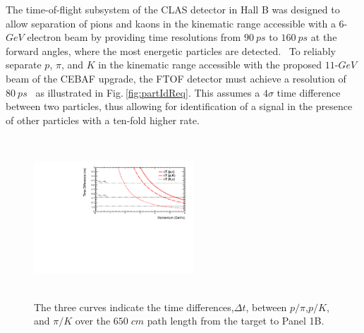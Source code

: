 The time-of-flight subsystem of the CLAS detector in Hall B was designed to allow separation of pions and kaons in the kinematic range accessible with a $6$-$GeV$ electron beam by providing time resolutions from $90\:ps$ to $160\:ps$ at the forward angles, where the most energetic particles are detected.~\cite{clastof} To reliably separate $p$, $\pi$, and $K$ in the kinematic range accessible with the proposed $11$-$GeV$ beam of the CEBAF upgrade, the FTOF detector must achieve a resolution of $80\:ps$~\cite{tdr} as illustrated in Fig.$\:$\ref{fig:partIdReq}. This assumes a $4\sigma$ time difference between two particles, thus allowing for identification of a signal in the presence of other particles with a ten-fold higher rate.
\begin{figure}[h!]
\centerline{\includegraphics[width=6cm,height=6cm]{evan/fig_evan_ftof_requirements/DeltaT.pdf}}
\caption{The three curves indicate the time differences,$\Delta t$, between $p/\pi$,$p/K$, and $\pi/K$ over the $650\;cm$ path length from the target to Panel 1B. }
\label{fig:DeltaT}
\end{figure}
